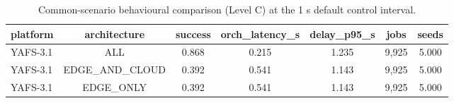 \begin{table}
\centering
\footnotesize
\caption{Common-scenario behavioural comparison (Level C) at the 1 s default control interval.}
\label{tab:common-level-c}
\begin{tabular}{lcccccc}
\toprule
platform & architecture & success & orch\_latency\_s & delay\_p95\_s & jobs & seeds \\
\midrule
YAFS-3.1 & ALL & 0.868 & 0.215 & 1.235 & 9,925 & 5.000 \\
YAFS-3.1 & EDGE\_AND\_CLOUD & 0.392 & 0.541 & 1.143 & 9,925 & 5.000 \\
YAFS-3.1 & EDGE\_ONLY & 0.392 & 0.541 & 1.143 & 9,925 & 5.000 \\
\bottomrule
\end{tabular}
\par\vspace{2pt}{\footnotesize\raggedright The reference workload, infrastructure and deployment sets are identical by specification; simulator-internal event semantics are deliberately allowed to differ.\par}
\end{table}
